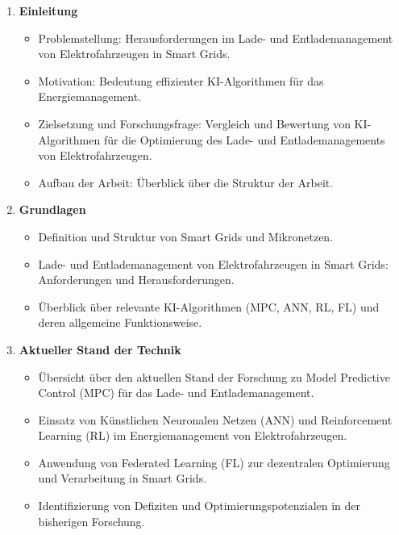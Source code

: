 \documentclass[12pt]{article} %
\begin{document}
\begin{enumerate}
    \item \textbf{Einleitung}
        \begin{itemize}
            \item Problemstellung: Herausforderungen im Lade- und Entlademanagement von Elektrofahrzeugen in Smart Grids.
            \item Motivation: Bedeutung effizienter KI-Algorithmen für das Energiemanagement.
            \item Zielsetzung und Forschungsfrage: Vergleich und Bewertung von KI-Algorithmen für die Optimierung des Lade- und Entlademanagements von Elektrofahrzeugen.
            \item Aufbau der Arbeit: Überblick über die Struktur der Arbeit.
        \end{itemize}
        
    \item \textbf{Grundlagen}
        \begin{itemize}
            \item Definition und Struktur von Smart Grids und Mikronetzen.
            \item Lade- und Entlademanagement von Elektrofahrzeugen in Smart Grids: Anforderungen und Herausforderungen.
            \item Überblick über relevante KI-Algorithmen (MPC, ANN, RL, FL) und deren allgemeine Funktionsweise.
        \end{itemize}
        
    \item \textbf{Aktueller Stand der Technik}
        \begin{itemize}
            \item Übersicht über den aktuellen Stand der Forschung zu Model Predictive Control (MPC) für das Lade- und Entlademanagement.
            \item Einsatz von Künstlichen Neuronalen Netzen (ANN) und Reinforcement Learning (RL) im Energiemanagement von Elektrofahrzeugen.
            \item Anwendung von Federated Learning (FL) zur dezentralen Optimierung und Verarbeitung in Smart Grids.
            \item Identifizierung von Defiziten und Optimierungspotenzialen in der bisherigen Forschung.
        \end{itemize}
        

\end{enumerate}
\end{document}
